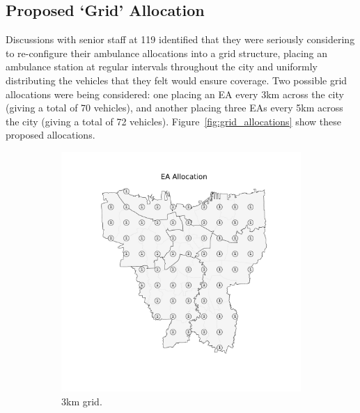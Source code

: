 \documentclass[preprint,12pt]{elsarticle}
\begin{document}
\subsection{Proposed `Grid' Allocation}\label{sec:analysis_grid}
Discussions with senior staff at 119 identified that they were seriously considering to re-configure their ambulance allocations into a grid structure, placing an ambulance station at regular intervals throughout the city and uniformly distributing the vehicles that they felt would ensure coverage. Two possible grid allocations were being considered: one placing an EA every 3km across the city (giving a total of 70 vehicles), and another placing three EAs every 5km across the city (giving a total of 72 vehicles). Figure~\ref{fig:grid_allocations} show these proposed allocations.

\begin{figure}
\begin{center}
\begin{subfigure}{0.48\textwidth}
\includegraphics[width=\textwidth]{img/map_grid3km_proposed}
\caption{3km grid.}
\end{subfigure}
\hfill
\begin{subfigure}{0.48\textwidth}

\end{subfigure}
\end{center}
\end{figure}
\end{document}
